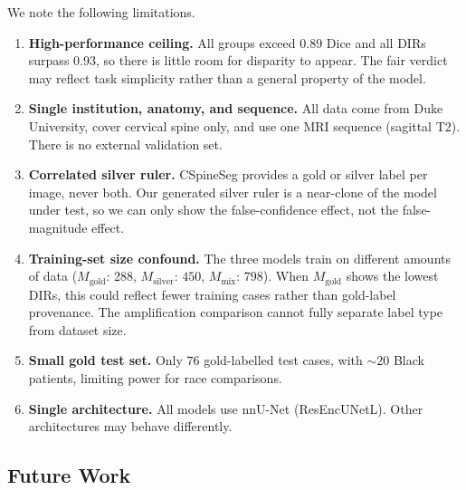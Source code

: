 We note the following limitations.

\begin{enumerate}
\item \textbf{High-performance ceiling.}
All groups exceed $0.89$ Dice and all DIRs surpass $0.93$, so there is little
room for disparity to appear. The fair verdict may reflect task simplicity rather
than a general property of the model.

\item \textbf{Single institution, anatomy, and sequence.}
All data come from Duke University, cover cervical spine only, and use one MRI
sequence (sagittal T2). There is no external validation set.

\item \textbf{Correlated silver ruler.}
CSpineSeg provides a gold or silver label per image, never both. Our generated
silver ruler is a near-clone of the model under test, so we can only show the
false-confidence effect, not the false-magnitude effect.

\item \textbf{Training-set size confound.}
The three models train on different amounts of data ($M_{\mathrm{gold}}$: $288$,
$M_{\mathrm{silver}}$: $450$, $M_{\mathrm{mix}}$: $798$). When
$M_{\mathrm{gold}}$ shows the lowest DIRs, this could reflect fewer training
cases rather than gold-label provenance. The amplification comparison cannot fully
separate label type from dataset size.

\item \textbf{Small gold test set.}
Only $76$ gold-labelled test cases, with ${\sim}20$ Black patients, limiting
power for race comparisons.

\item \textbf{Single architecture.}
All models use nnU-Net (ResEncUNetL). Other architectures may behave differently.
\end{enumerate}

\subsection{Future Work}
\label{sec:future_work}

